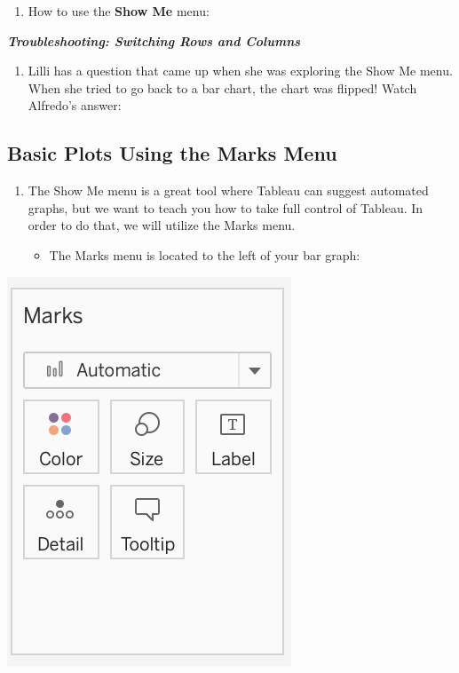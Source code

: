 \documentclass[
]{book}
\providecommand{\tightlist}{%
  \setlength{\itemsep}{0pt}\setlength{\parskip}{0pt}}
\begin{document}
\begin{enumerate}
\def\labelenumi{\arabic{enumi}.}
\setcounter{enumi}{2}
\tightlist
\item
  How to use the \textbf{Show Me} menu:
\end{enumerate}

\textbf{\emph{Troubleshooting: Switching Rows and Columns}}

\begin{enumerate}
\def\labelenumi{\arabic{enumi}.}
\tightlist
\item
  Lilli has a question that came up when she was exploring the Show Me menu. When she tried to go back to a bar chart, the chart was flipped! Watch Alfredo's answer:
\end{enumerate}

\hypertarget{basic-plots-using-the-marks-menu}{%
\subsection{Basic Plots Using the Marks Menu}\label{basic-plots-using-the-marks-menu}}

\begin{enumerate}
\def\labelenumi{\arabic{enumi}.}
\tightlist
\item
  The Show Me menu is a great tool where Tableau can suggest automated graphs, but we want to teach you how to take full control of Tableau. In order to do that, we will utilize the Marks menu.

  \begin{itemize}
  \tightlist
  \item
    The Marks menu is located to the left of your bar graph:
  \end{itemize}
\end{enumerate}

\includegraphics{images/M3S2_Marks-Menu.png}
\end{document}
